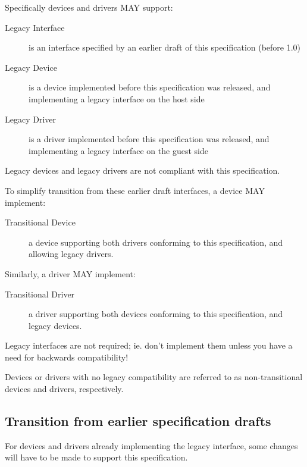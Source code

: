 Specifically devices and drivers MAY support:
\begin{description}
\item[Legacy Interface]
        is an interface specified by an earlier draft of this specification
        (before 1.0)
\item[Legacy Device]
        is a device implemented before this specification was released,
        and implementing a legacy interface on the host side
\item[Legacy Driver]
        is a driver implemented before this specification was released,
        and implementing a legacy interface on the guest side
\end{description}

Legacy devices and legacy drivers are not compliant with this
specification.

To simplify transition from these earlier draft interfaces,
a device MAY implement:

\begin{description}
\item[Transitional Device]
        a device supporting both drivers conforming to this
        specification, and allowing legacy drivers.
\end{description}

Similarly, a driver MAY implement:
\begin{description}
\item[Transitional Driver]
        a driver supporting both devices conforming to this
        specification, and legacy devices.
\end{description}

\begin{note}
  Legacy interfaces are not required; ie. don't implement them unless you
  have a need for backwards compatibility!
\end{note}

Devices or drivers with no legacy compatibility are referred to as
non-transitional devices and drivers, respectively.

\subsection{Transition from earlier specification drafts}\label{sec:Transition from earlier specification drafts}

For devices and drivers already implementing the legacy
interface, some changes will have to be made to support this
specification.

